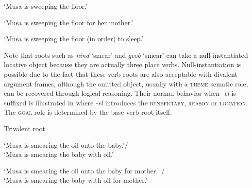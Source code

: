 \documentclass[output=paper]{langsci/langscibook}
\begin{document}
\glt ‘Musa is sweeping the floor.’


\glt ‘Musa is sweeping the floor for her mother.’


\glt ‘Musa is sweeping the floor (in order) to sleep.’
\z
\z

Note that roots such as \textit{nind} ‘smear’ and \textit{gcob} ‘smear’ can take a null-instantiated locative object because they are actually three place verbs. Null-instantiation is possible due to the fact that these verb roots are also acceptable with divalent argument frames, although the omitted object, usually with a \textsc{theme} sematic role, can be recovered through logical reasoning. Their normal behavior when \textit{-el} is suffixed is illustrated in  where \textit{-el} introduces the \textsc{beneficiary}, \textsc{reason} or \textsc{location}. The \textsc{goal} role is determined by the base verb root itself.

\ea\label{ex:sibanda:10}
\settowidth{}
{Trivalent root}\\

\glt ‘Musa is smearing the oil onto the baby.’/\\
 ‘Musa is smearing the baby with oil.’


\glt ‘Musa is smearing the oil onto the baby for mother.’ /\\
‘Musa is smearing the baby with oil for mother.’

\end{document}
